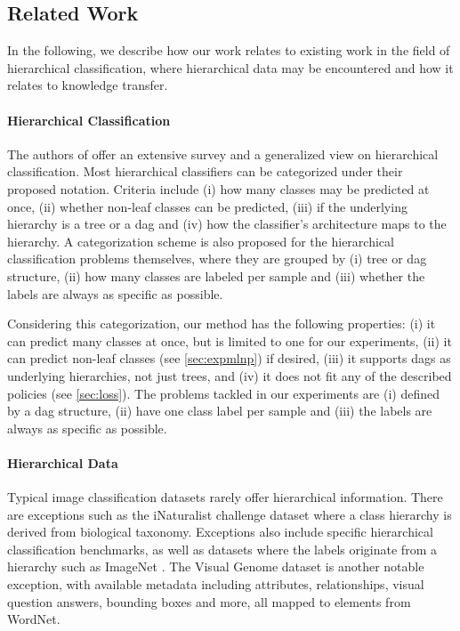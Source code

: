\documentclass[10pt,twocolumn,letterpaper]{article}
\begin{document}
\subsection{Related Work}
In the following, we describe how our work relates to existing work in the field
of hierarchical classification, where hierarchical data may be encountered
and how it relates to knowledge transfer.
\paragraph{Hierarchical Classification}
The authors of \cite{Silla2011HClass} offer an extensive survey and a generalized view on hierarchical classification.
Most hierarchical classifiers can be categorized under their proposed notation. Criteria
include (i) how many classes may be predicted at once, (ii) whether non-leaf classes can be
predicted, (iii) if the underlying hierarchy is a tree or a \gls{dag} and (iv)
how the classifier's architecture maps to the hierarchy. A categorization scheme is also
proposed for the hierarchical classification problems themselves, where they are grouped by
(i) tree or \gls{dag} structure, (ii) how many classes are labeled per sample and (iii) whether
the labels are always as specific as possible.

Considering this categorization, our method has the following properties: (i) it can predict
many classes at once, but is limited to one for our experiments, (ii) it can predict
non-leaf classes (see \cref{sec:expmlnp}) if desired, (iii) it supports \glspl{dag} as underlying
hierarchies, not just trees, and (iv) it does not fit any of the described policies (see \cref{sec:loss}).
The problems tackled in our experiments are (i) defined by a \gls{dag} structure, (ii) have
one class label per sample and (iii) the labels are always as specific as possible.


\paragraph{Hierarchical Data}
Typical image classification datasets rarely offer hierarchical information. There are exceptions
such as the iNaturalist challenge dataset \cite{VanHorn2017iNat} where a class hierarchy is
derived from biological taxonomy. Exceptions also include specific hierarchical classification
benchmarks, \eg \cite{Partalas2015LSHTC,Torralba2008Tiny} as well as datasets where the labels
originate from a hierarchy such as ImageNet \cite{Deng2009ImageNet}.
The Visual Genome dataset \cite{Krishna2017VG} is another notable exception, with available metadata
including attributes, relationships, visual question answers, bounding boxes and more, all
mapped to elements from WordNet.
\end{document}
